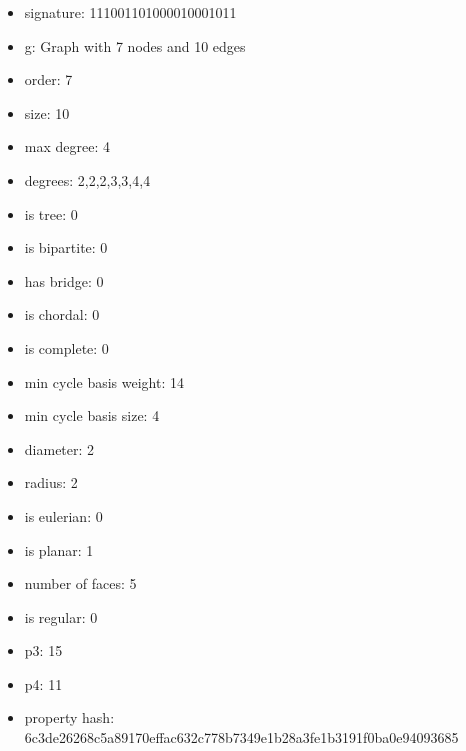 \begin{itemize}
\item signature: 111001101000010001011
\item g: Graph with 7 nodes and 10 edges
\item order: 7
\item size: 10
\item max degree: 4
\item degrees: 2,2,2,3,3,4,4
\item is tree: 0
\item is bipartite: 0
\item has bridge: 0
\item is chordal: 0
\item is complete: 0
\item min cycle basis weight: 14
\item min cycle basis size: 4
\item diameter: 2
\item radius: 2
\item is eulerian: 0
\item is planar: 1
\item number of faces: 5
\item is regular: 0
\item p3: 15
\item p4: 11
\item property hash: 6c3de26268c5a89170effac632c778b7349e1b28a3fe1b3191f0ba0e94093685
\end{itemize}
\newpage
\begin{figure}
\end{figure}
